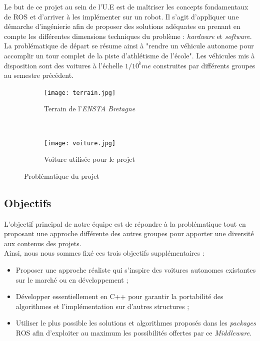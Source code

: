 \documentclass[12pt, openany]{report}
\begin{document}
Le but de ce projet au sein de l'U.E est de maîtriser les concepts fondamentaux de \textsc{ROS} et d'arriver à les implémenter sur un robot. Il s'agit d'appliquer une démarche d'ingénierie afin de proposer des solutions adéquates en prenant en compte les différentes dimensions techniques du problème : \textit{hardware} et \textit{software}.\\

La problématique de départ se résume ainsi à "rendre un véhicule autonome pour accomplir un tour complet de la piste d'athlétisme de l'école". Les véhicules mis à disposition sont des voitures à l'échelle $1/10^ème$ construites par différents groupes au semestre précédent.

\begin{figure}[!h]
     \centering
     \begin{subfigure}[b]{0.45\textwidth}
         \centering
         \texttt{[image: terrain.jpg]}
         \caption{Terrain de l'\textit{ENSTA Bretagne}}
     \end{subfigure}
     ~
     \begin{subfigure}[b]{0.45\textwidth}
         \centering
         \texttt{[image: voiture.jpg]}
         \caption{Voiture utilisée pour le projet}
     \end{subfigure}
     \caption{Problématique du projet}
     \label{fig:prob}
\end{figure}

\subsection{Objectifs}
L'objectif principal de notre équipe est de répondre à la problématique tout en proposant une approche différente des autres groupes pour apporter une diversité aux contenus des projets.\\

Ainsi, nous nous sommes fixé ces trois objectifs supplémentaires : 
\begin{itemize}[label=\textbullet, font=\small]
    \item Proposer une approche réaliste qui s'inspire des voitures autonomes existantes sur le marché ou en développement ;
    \item Développer essentiellement en \textsc{C++} pour garantir la portabilité des algorithmes et l'implémentation sur d'autres structures ;\\
    \item Utiliser le plus possible les solutions et algorithmes proposés dans les \textit{packages} \textsc{ROS} afin d'exploiter au maximum les possibilités offertes par ce \textit{Middleware}.\\
\end{itemize}
\end{document}
